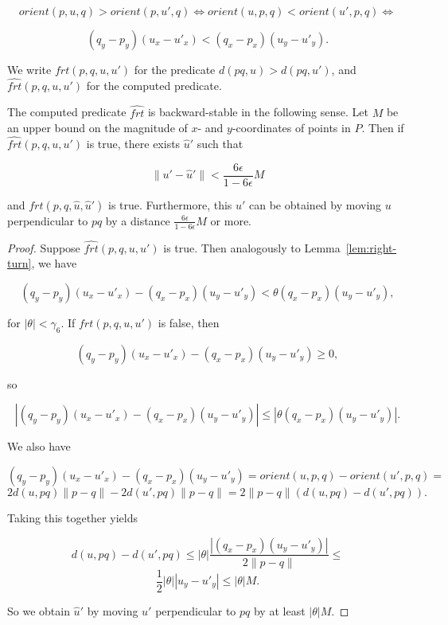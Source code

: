 $$orient(p, u, q) > orient(p, u', q) \iff orient(u, p, q) < orient(u', p, q) 
\iff$$

$$(q_y - p_y) (u_x - u'_x) < (q_x - p_x) (u_y - u'_y).$$

We write $frt(p, q, u, u')$ for the predicate $d(pq, u) > d(pq, u')$,
and $\widehat{frt}(p, q, u, u')$ for the computed predicate.

\begin{lemma}\label{lem:farther}
    The computed predicate $\widehat{frt}$ is backward-stable in the 
    following sense. Let $M$ be an upper bound on the magnitude of 
    $x$- and $y$-coordinates of points in $P$. 
    Then if $\widehat{frt}(p, q, u, u')$ is true, there exists 
    $\hat{u}'$ such that

    $$\lVert u' - \hat{u}' \rVert < \frac{6\epsilon}{1 - 6\epsilon}M$$

    and $frt(p, q, \hat{u}, \hat{u}')$ is true. Furthermore, this 
    $\hat{u}'$ can be obtained by moving $u$ perpendicular to $pq$
    by a distance $\frac{6\epsilon}{1 - 6\epsilon}M$ or more.
\end{lemma}

\begin{proof}
    Suppose $\widehat{frt}(p, q, u, u')$ is true. Then analogously to 
    Lemma~\ref{lem:right-turn}, we have

    $$(q_y - p_y) (u_x - u'_x) - (q_x - p_x) (u_y - u'_y) < 
            \theta(q_x - p_x) (u_y - u'_y),$$

    for $|\theta| < \gamma_6$. If $frt(p, q, u, u')$ is false, then

    $$(q_y - p_y) (u_x - u'_x) - (q_x - p_x) (u_y - u'_y) \geq 0,$$

    so 

    $$|(q_y - p_y) (u_x - u'_x) - (q_x - p_x) (u_y - u'_y)| \leq 
        |\theta(q_x - p_x) (u_y - u'_y)|.$$

    We also have 

    $$(q_y - p_y) (u_x - u'_x) - (q_x - p_x) (u_y - u'_y) =
       orient(u, p, q) - orient(u', p, q) =$$
    $$2 d(u, pq) \lVert p - q \rVert - 2 d(u', pq) \lVert p - q \rVert = 
        2 \lVert p - q \rVert (d(u, pq) - d(u', pq)).$$

    Taking this together yields

    $$d(u, pq) - d(u', pq) \leq 
       |\theta|\frac{|(q_x - p_x) (u_y - u'_y)|}{2 \lVert p - q \rVert} \leq$$
    $$\frac{1}{2}|\theta| |u_y - u'_y| \leq |\theta|M.$$

    So we obtain $\hat{u}'$ by moving $u'$ perpendicular to $pq$ by at least
    $|\theta|M$.
\end{proof}

